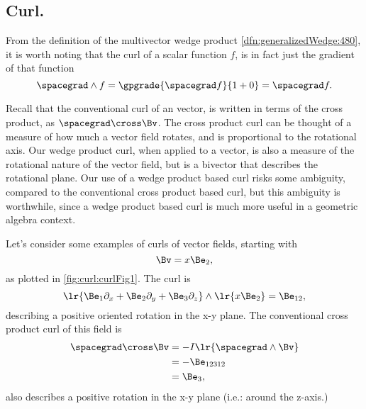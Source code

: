 %
%
\subsection{Curl.}
From the definition of the multivector wedge product \cref{dfn:generalizedWedge:480}, it is worth noting that
the curl of a scalar function \( f \), is in fact just the gradient of that function
\begin{equation}\label{eqn:vectorcalc:200}
\spacegrad \wedge f = \gpgrade{\spacegrad f}{1+0} = \spacegrad f.
\end{equation}

Recall that the conventional curl of an  vector, is written in terms of the cross product, as \( \spacegrad \cross \Bv \).  The cross product curl can be thought of a measure of how much a vector field rotates, and is proportional to the rotational axis.  Our wedge product curl, when applied to a vector, is also a measure of the rotational nature of the vector field, but is a bivector that describes the rotational plane.
Our use of a wedge product based curl risks some ambiguity, compared to the conventional  cross product based curl, but this ambiguity is worthwhile, since a wedge product based curl is much more useful in a geometric algebra context.

Let's consider some examples of curls of vector fields, starting with
\begin{equation}\label{eqn:vectorcalc:1030}
\Bv = x \Be_2,
\end{equation}
as plotted in \cref{fig:curl:curlFig1}.
The curl is
\begin{equation}\label{eqn:vectorcalc:1050}
\lr{ \Be_1 \partial_x + \Be_2 \partial_y + \Be_3 \partial_z } \wedge \lr{ x \Be_2 }
=
\Be_{12},
\end{equation}
describing a positive oriented rotation in the x-y plane.
The conventional cross product curl of this field is
\begin{equation}\label{eqn:vectorcalc:1070}
\begin{aligned}
\spacegrad \cross \Bv
&= -I \lr{ \spacegrad \wedge \Bv }  \\
&= - \Be_{12312}  \\
&= \Be_3,
\end{aligned}
\end{equation}
also describes a positive rotation in the x-y plane (i.e.: around the z-axis.)

